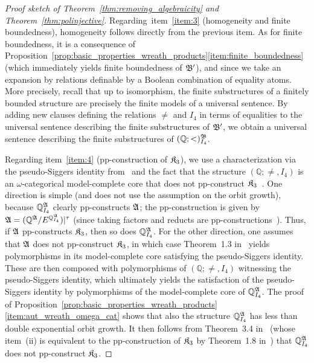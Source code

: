 \begin{proof}[Proof sketch of Theorem~\ref{thm:removing_algebraicity} and Theorem~\ref{thm:polinjective}]
 Regarding~item~\ref{item:3} (homogeneity and finite boundedness), homogeneity  follows directly from the previous item. As for finite boundedness,  it is a consequence of Proposition~\ref{prop:basic_properties_wreath_products}\eqref{item:finite_boundedness} (which immediately yields finite boundedness of $\mathfrak{B}'$), and since we take an expansion by relations definable by a Boolean combination of equality atoms.
%
More precisely, recall that up to isomorphism, the finite substructures of a finitely bounded structure are precisely the finite models of a universal sentence.
%
By adding new clauses defining  the relations $\neq$ and $I_4$ in terms of equalities to the universal sentence describing the finite substructures of $\mathfrak{B}'$, we obtain a universal sentence describing the finite substructures of $(\mathbb{Q};<)^{\mathfrak{B}}_{I_4}$. 
 
 Regarding item~\ref{item:4} (pp-construction of $\mathfrak{K}_3$), we use  a characterization via the pseudo-Siggers identity from~\cite[Theorems~1.3 and~3.4]{barto2019equations} and the fact that the structure $(\mathbb{Q};\neq, I_4)$ is an $\omega$-categorical model-complete core that does not pp-construct  $\mathfrak{K}_3$~\cite[Theorems~12.0.1,~12.7.3,~12.9.2, and Corollary~6.4.4]{bodirsky2021complexity}. 
%
One direction is simple (and does not use the assumption on the orbit growth), because $\mathbb{Q}^{\mathfrak{A}}_{I_4}$ clearly pp-constructs $\mathfrak{A}$;
%
the pp-construction is given by $\mathfrak{A} =(\smash{\mathbb{Q}^{\mathfrak{A}}/E^{\smash{\mathbb{Q}^{\mathfrak{A}}_{I_4}}})|^{\tau}}$ (since taking factors and reducts are pp-constructions~\cite{barto2018wonderland}). Thus, if $\mathfrak{A}$ pp-constructs $\mathfrak{K}_3$, then so does $\mathbb{Q}^{\mathfrak{A}}_{I_4}$. 
%
For the other direction, one assumes that $\mathfrak{A}$ does not pp-construct $\mathfrak{K}_3$, in which case Theorem~1.3 in~\cite{barto2019equations} yields polymorphisms in its model-complete core satisfying the pseudo-Siggers identity. 
%
These are then composed with polymorphisms of $(\mathbb{Q};\neq, I_4)$ witnessing the pseudo-Siggers identity, which ultimately yields the satisfaction of the pseudo-Siggers identity by polymorphisms of the model-complete core of $\mathbb{Q}^{\mathfrak{A}}_{I_4}$. The proof of Proposition~\ref{prop:basic_properties_wreath_products}\eqref{item:aut_wreath_omega_cat} shows  that also the structure $\mathbb{Q}^{\mathfrak{A}}_{I_4}$ has less than double exponential orbit growth.
%
It then follows from Theorem~3.4 in~\cite{barto2019equations} (whose item~(ii) is equivalent to the pp-construction of $\mathfrak{K}_3$ by Theorem~1.8 in~\cite{barto2018wonderland}) that $\mathbb{Q}^{\mathfrak{A}}_{I_4}$ does not pp-construct $\mathfrak{K}_3$.  
\end{proof}

